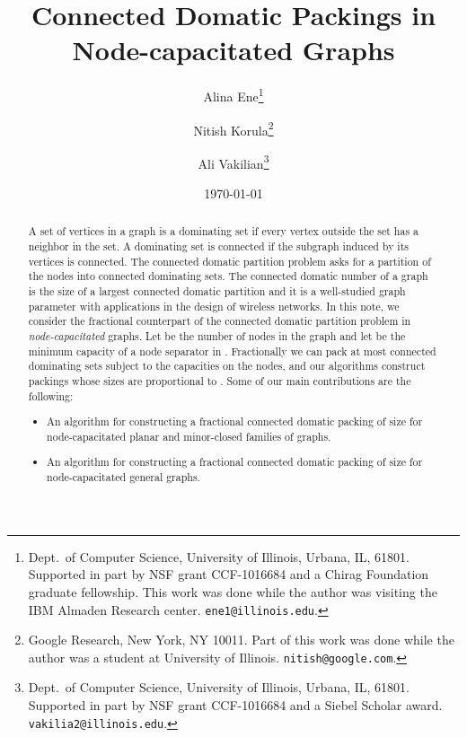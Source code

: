 \documentclass[11pt]{article}
\begin{document}
\title{Connected Domatic Packings in Node-capacitated Graphs}
\author{
Alina Ene\thanks{Dept.\ of Computer Science, University of Illinois,
Urbana, IL, 61801. Supported in part by NSF grant CCF-1016684 and a
Chirag Foundation graduate fellowship. This work was done while the
author was visiting the IBM Almaden Research center.
{\tt ene1@illinois.edu}.}
\and
Nitish Korula\thanks{
Google Research, New York, NY 10011. Part of this work was done while
the author was a student at University of Illinois.
{\tt nitish@google.com}.}
\and
Ali Vakilian\thanks{
Dept.\ of Computer Science, University of Illinois, Urbana, IL,
61801. Supported in part by NSF grant CCF-1016684 and a Siebel Scholar award. 
{\tt vakilia2@illinois.edu}.}}

\date{\today}

\maketitle

\begin{abstract}
	A set of vertices in a graph is a dominating set if every vertex
	outside the set has a neighbor in the set. A dominating set is
	connected if the subgraph induced by its vertices is connected.
	The connected domatic partition problem asks for a partition of
	the nodes into connected dominating sets. The connected domatic
	number of a graph is the size of a largest connected domatic
	partition and it is a well-studied graph parameter with
	applications in the design of wireless networks.
In this note, we consider the fractional counterpart of the
	connected domatic partition problem in \emph{node-capacitated}
	graphs. Let  be the number of nodes in the graph and let 
	be the minimum capacity of a node separator in . Fractionally
	we can pack at most  connected dominating sets subject to the
	capacities on the nodes, and our algorithms construct packings
	whose sizes are proportional to . Some of our main
	contributions are the following:
\begin{itemize}
		\item An algorithm for constructing a fractional connected
		domatic packing of size  for
		node-capacitated planar and minor-closed families of graphs.
\item An algorithm for constructing a fractional connected
		domatic packing of size  for
		node-capacitated general graphs.
\end{itemize}
\end{abstract}
\end{document}
